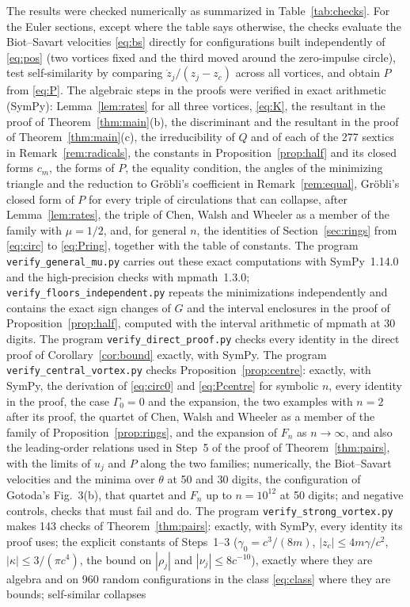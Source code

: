 \documentclass[11pt]{article}
\theoremstyle{definition}
\begin{document}
The results were checked numerically as summarized in Table~\ref{tab:checks}. For the Euler sections, except where the table says otherwise, the checks evaluate the Biot--Savart velocities \eqref{eq:bs} directly for configurations built independently of \eqref{eq:pos} (two vortices fixed and the third moved around the zero-impulse circle), test self-similarity by comparing $\dot z_j/(z_j - z_c)$ across all vortices, and obtain $P$ from \eqref{eq:P}. The algebraic steps in the proofs were verified in exact arithmetic (SymPy): Lemma~\ref{lem:rates} for all three vortices, \eqref{eq:K}, the resultant in the proof of Theorem~\ref{thm:main}(b), the discriminant and the resultant in the proof of Theorem~\ref{thm:main}(c), the irreducibility of $Q$ and of each of the 277 sextics in Remark~\ref{rem:radicals}, the constants in Proposition~\ref{prop:half} and its closed forms $c_m$, the forms of $P$, the equality condition, the angles of the minimizing triangle and the reduction to Gr\"obli's coefficient in Remark~\ref{rem:equal}, Gr\"obli's closed form of $P$ for every triple of circulations that can collapse, after Lemma~\ref{lem:rates}, the triple of Chen, Walsh and Wheeler as a member of the family with $\mu = 1/2$, and, for general $n$, the identities of Section~\ref{sec:rings} from \eqref{eq:circ} to \eqref{eq:Pring}, together with the table of constants. The program \texttt{verify\_\allowbreak general\_\allowbreak mu.py} carries out these exact computations with SymPy~1.14.0 and the high-precision checks with mpmath~1.3.0; \texttt{verify\_\allowbreak floors\_\allowbreak independent.py} repeats the minimizations independently and contains the exact sign changes of $G$ and the interval enclosures in the proof of Proposition~\ref{prop:half}, computed with the interval arithmetic of mpmath at 30 digits. The program \texttt{verify\_\allowbreak direct\_\allowbreak proof.py} checks every identity in the direct proof of Corollary~\ref{cor:bound} exactly, with SymPy. The program \texttt{verify\_\allowbreak central\_\allowbreak vortex.py} checks Proposition~\ref{prop:centre}: exactly, with SymPy, the derivation of \eqref{eq:circ0} and \eqref{eq:Pcentre} for symbolic $n$, every identity in the proof, the case $\Gamma_0 = 0$ and the expansion, the two examples with $n = 2$ after its proof, the quartet of Chen, Walsh and Wheeler as a member of the family of Proposition~\ref{prop:rings}, and the expansion of $F_n$ as $n \to \infty$, and also the leading-order relations used in Step~5 of the proof of Theorem~\ref{thm:pairs}, with the limits of $u_j$ and $P$ along the two families; numerically, the Biot--Savart velocities and the minima over $\theta$ at 50 and 30 digits, the configuration of Gotoda's Fig.~3(b), that quartet and $F_n$ up to $n = 10^{12}$ at 50 digits; and negative controls, checks that must fail and do. The program \texttt{verify\_\allowbreak strong\_\allowbreak vortex.py} makes 143 checks of Theorem~\ref{thm:pairs}: exactly, with SymPy, every identity its proof uses; the explicit constants of Steps~1--3 ($\gamma_0 = c^3/(8m)$, $|z_c| \le 4m\gamma/c^2$, $|\kappa| \le 3/(\pi c^4)$, the bound on $|\rho_j|$ and $|\nu_j| \le 8c^{-10}$), exactly where they are algebra and on 960 random configurations in the class \eqref{eq:class} where they are bounds; self-similar collapses 
\end{document}
